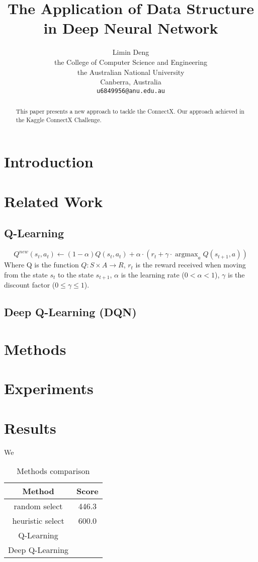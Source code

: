 \documentclass{article}
\title{The Application of Data Structure in Deep Neural Network}
\author{%
Limin Deng \\
the College of Computer Science and Engineering\\
 the Australian National University\\
  Canberra, Australia\\
  \texttt{u6849956@anu.edu.au} \\
}
\begin{document}
\maketitle

\begin{abstract}
This paper presents a new approach to tackle the ConnectX. Our approach achieved in the Kaggle ConnectX Challenge.
\end{abstract}

\section{Introduction}


\section{Related Work}
\subsection{Q-Learning}
\begin{equation}
Q^{new}(s_t, a_t)  \leftarrow (1-\alpha)Q(s_t, a_t) + \alpha \cdot \left(r_t + \gamma \cdot \mathop{\arg\max}_{a}  Q(s_{t+1}, a) \right)
\end{equation}
Where Q is the function $Q: S \times A \rightarrow R$, $r_t$ is the reward received when moving from the state $s_t$ to the state $s_{t+1}$, $\alpha$ is the learning rate ($ 0 < \alpha < 1$), $\gamma$ is the discount factor ($0 \leq \gamma \leq 1$).
\subsection{Deep Q-Learning (DQN)}

\section{Methods}

\section{Experiments}


\section{Results}

We 
\begin{table}[!htp]
\centering
\begin{tabular}{c|c}
\toprule
Method & Score \\
\toprule
random select & 446.3 \\
\hline
heuristic select & 600.0 \\
\hline
Q-Learning & \\
\hline
Deep Q-Learning & \\
\bottomrule
\end{tabular}
\caption{Methods comparison}
\label{tab:methods}
\end{table}





\end{document}
